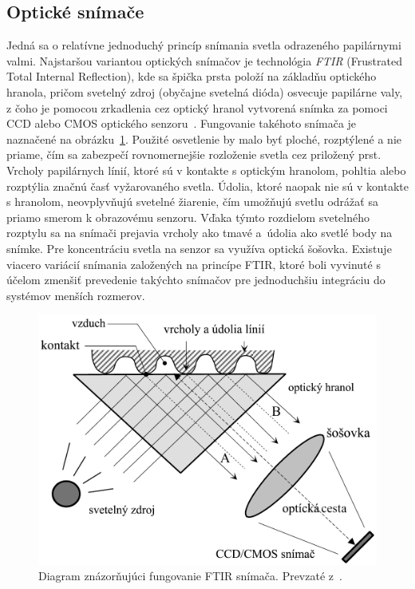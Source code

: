   \subsection{Optické snímače}
  Jedná sa o relatívne jednoduchý princíp snímania svetla odrazeného papilárnymi valmi. Najstaršou variantou optických snímačov je technológia \emph{FTIR}
  (Frustrated Total Internal Reflection), kde sa špička prsta položí na základňu optického hranola, pričom svetelný zdroj (obyčajne svetelná dióda) osvecuje
  papilárne valy, z čoho je pomocou zrkadlenia cez optický hranol vytvorená snímka za pomoci CCD alebo CMOS optického senzoru~{\cite{Drahansky}}.
  Fungovanie takéhoto snímača
  je naznačené na obrázku~{\ref{obr:ftir_snimac}}. Použité osvetlenie by malo byť ploché, rozptýlené a nie priame, čím sa zabezpečí rovnomernejšie rozloženie
  svetla cez priložený prst. Vrcholy papilárnych línií, ktoré sú v kontakte s optickým hranolom, pohltia alebo rozptýlia značnú časť vyžarovaného svetla. Údolia,
  ktoré naopak nie sú v kontakte s hranolom, neovplyvňujú svetelné žiarenie, čím umožňujú svetlu odrážať sa priamo smerom k obrazovému senzoru. Vďaka týmto
  rozdielom svetelného rozptylu sa na snímači prejavia vrcholy ako tmavé a~údolia ako svetlé body na snímke. Pre koncentráciu svetla na senzor sa využíva
  optická šošovka. Existuje viacero variácií snímania založených na princípe FTIR, ktoré boli vyvinuté s účelom zmenšiť prevedenie takýchto snímačov
  pre jednoduchšiu integráciu do systémov menších rozmerov.

  \begin{figure}[h]
    \centering
    \includegraphics[width=0.6\linewidth]{obrazky-figures/ftir_snimac.png}
    \caption{Diagram znázorňujúci fungovanie FTIR snímača. Prevzaté z~{\cite{Handbook}}.}
    \label{obr:ftir_snimac}
  \end{figure}

